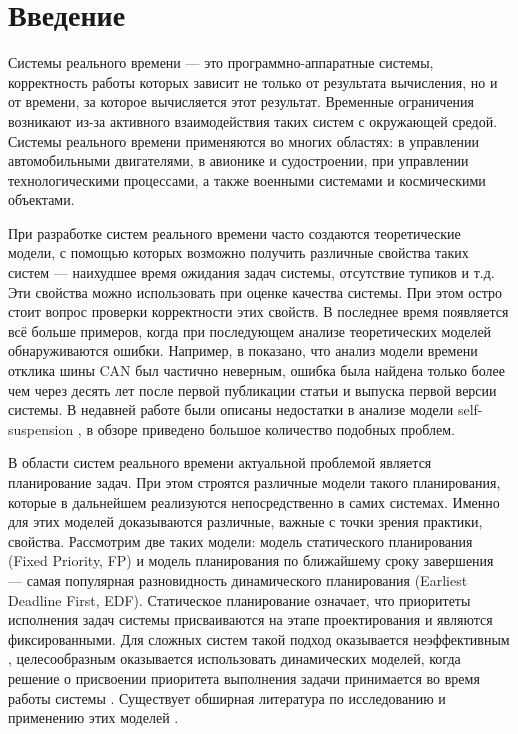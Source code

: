 
\section*{Введение}

Системы реального времени --- это программно-аппаратные системы, корректность работы которых
  зависит не только от результата вычисления, но и от времени, за которое вычисляется
  этот результат. Временные ограничения возникают из-за активного взаимодействия таких
  систем с окружающей средой. Системы реального времени применяются во многих областях:
  в управлении автомобильными двигателями, в авионике и судостроении, при управлении
  технологическими процессами, а также военными системами и космическими объектами.

При разработке систем реального времени часто создаются теоретические модели, с
  помощью которых возможно получить различные свойства
  таких систем --- наихудшее время ожидания задач системы, отсутствие тупиков и т.д.
  Эти свойства можно использовать при оценке качества системы.
  При этом остро стоит вопрос проверки корректности этих свойств.
  В последнее время появляется всё больше примеров, когда при последующем анализе
  теоретических моделей обнаруживаются ошибки. Например, в \cite{Bril06messageresponse}
  показано, что анализ модели времени отклика шины CAN \cite{Tindell1994AnEA}
  был частично неверным, ошибка была найдена только более чем через десять лет после
  первой публикации статьи и выпуска первой версии системы. В недавней работе \cite{nelissen}
  были описаны недостатки в анализе модели self-suspension \cite{lakshmanan:1},
  в обзоре \cite{chen} приведено большое количество  подобных проблем.

В области систем реального времени актуальной проблемой является планирование
  задач. При этом строятся различные модели такого планирования, которые в дальнейшем
  реализуются непосредственно в самих системах. Именно для этих моделей доказываются
  различные, важные с точки зрения практики, свойства.
  Рассмотрим две таких модели: модель статического планирования (Fixed Priority, FP)
  и модель планирования по ближайшему сроку завершения --- самая популярная разновидность
  динамического планирования (Earliest Deadline First, EDF). Статическое планирование
  означает, что приоритеты исполнения задач системы присваиваются на этапе
  проектирования и являются фиксированными. Для сложных систем такой подход оказывается
  неэффективным \cite{Liu1973SchedulingAF}, целесообразным оказывается использовать
  динамических моделей, когда решение о присвоении приоритета выполнения задачи
  принимается во время работы системы \cite{Baruah2003DynamicAS, Becker2001ExecutionEF, Spuri1996SchedulingAT}.
  Существует обширная литература по исследованию и применению этих моделей
  \cite{Campoy2004SchedulabilityAI, Kwok1999StaticSA, Sakellariou2007SchedulingWW, Wang1999SchedulingFT}.

